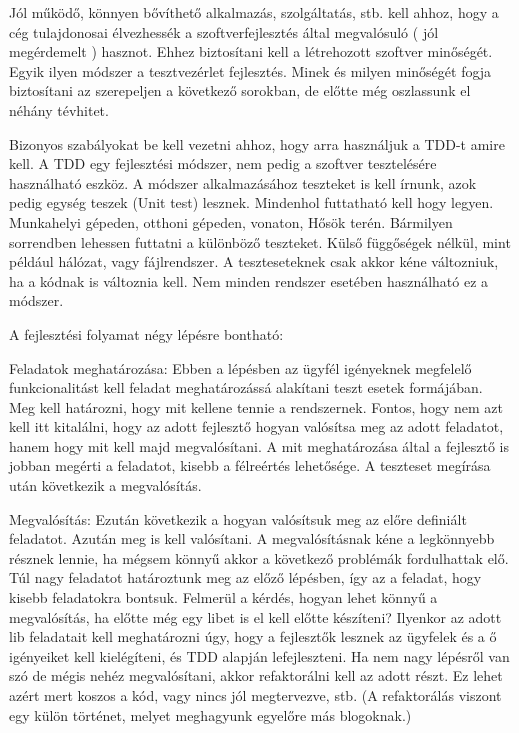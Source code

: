 Jól működő, könnyen bővíthető alkalmazás, szolgáltatás, stb. kell ahhoz, hogy a cég tulajdonosai élvezhessék a szoftverfejlesztés által megvalósuló ( jól megérdemelt ) hasznot. Ehhez biztosítani kell a létrehozott szoftver minőségét. Egyik ilyen módszer a tesztvezérlet fejlesztés. Minek és milyen minőségét fogja biztosítani az szerepeljen a következő sorokban, de előtte még oszlassunk el néhány tévhitet.

Bizonyos szabályokat be kell vezetni ahhoz, hogy arra használjuk a TDD-t amire kell. A TDD egy fejlesztési módszer, nem pedig a szoftver tesztelésére használható eszköz. A módszer alkalmazásához teszteket is kell írnunk, azok pedig egység teszek (Unit test) lesznek. Mindenhol futtatható kell hogy legyen. Munkahelyi gépeden, otthoni gépeden, vonaton, Hősök terén. Bármilyen sorrendben lehessen futtatni a különböző teszteket. Külső függőségek nélkül, mint  például hálózat, vagy fájlrendszer. A teszteseteknek csak akkor kéne változniuk, ha a kódnak is változnia kell. Nem minden rendszer esetében használható ez a módszer.

A fejlesztési folyamat négy lépésre bontható:

Feladatok meghatározása:
     Ebben a lépésben az ügyfél igényeknek megfelelő funkcionalitást kell feladat meghatározássá alakítani teszt esetek formájában. Meg kell határozni, hogy mit kellene tennie a rendszernek. Fontos, hogy nem azt kell itt kitalálni, hogy az adott fejlesztő hogyan valósítsa meg az adott feladatot, hanem hogy mit kell majd megvalósítani. A mit meghatározása által a fejlesztő is jobban megérti a feladatot, kisebb a félreértés lehetősége. A teszteset megírása után következik a megvalósítás.

Megvalósítás:
     Ezután következik a hogyan valósítsuk meg az előre definiált feladatot. Azután meg is kell valósítani. A megvalósításnak kéne a legkönnyebb résznek lennie, ha mégsem könnyű akkor a következő problémák fordulhattak elő. Túl nagy feladatot határoztunk meg az előző lépésben, így az a feladat, hogy kisebb feladatokra bontsuk. Felmerül a kérdés, hogyan lehet könnyű a megvalósítás, ha előtte még egy libet is el kell előtte készíteni? Ilyenkor az adott lib feladatait kell meghatározni úgy, hogy a fejlesztők lesznek az ügyfelek és a ő igényeiket kell kielégíteni, és TDD alapján lefejleszteni.
     Ha nem nagy lépésről van szó de mégis nehéz megvalósítani, akkor refaktorálni kell az adott részt. Ez lehet azért mert koszos a kód, vagy nincs jól megtervezve, stb. (A refaktorálás viszont egy külön történet, melyet meghagyunk egyelőre más blogoknak.)

